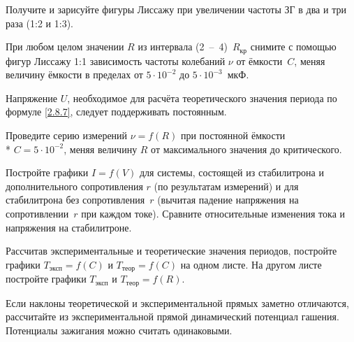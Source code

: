 \begin{lab:task}
Получите и зарисуйте фигуры Лиссажу при увеличении частоты ЗГ в два и три раза
(1:2 и 1:3).

		\item При любом целом значении $R$ из интервала (2~--~4)~$R_{\text{кр}}$
снимите с помощью фигур Лиссажу 1:1 зависимость частоты
колебаний $\nu$ от ёмкости~$C$, меняя величину ёмкости в пределах от
$5\cdot10^{-2}$ до $5\cdot10^{-3}$~мкФ.

Напряжение $U$, необходимое для расчёта теоретического значения периода по
формуле \eqref{2.8.7}, следует поддерживать
постоянным.

		\item Проведите серию измерений $\nu=f(R)$ при постоянной ёмкости\\*
$C=5\cdot10^{-2}$, меняя величину $R$ от максимального
значения до критического.


		\item Постройте графики $I=f(V)$ для системы, состоящей из стабилитрона
и дополнительного сопротивления $r$ (по результатам
измерений) и для стабилитрона без сопротивления~$r$ (вычитая падение напряжения
на сопротивлении~$r$ при каждом токе).
Сравните относительные изменения тока и напряжения на стабилитроне.

		\item Рассчитав экспериментальные и теоретические значения периодов,
постройте графики $T_{\text{эксп}}=f(C)$ и $T_{\text{теор}}=f(C)$ на
одном листе.
На другом листе постройте графики $T_{\text{эксп}}$ и $T_{\text{теор}}=f(R)$.

		\item Если наклоны теоретической и экспериментальной прямых заметно
отличаются, рассчитайте из экспериментальной прямой
динамический потенциал гашения. Потенциалы зажигания можно считать одинаковыми.
\end{lab:task}


